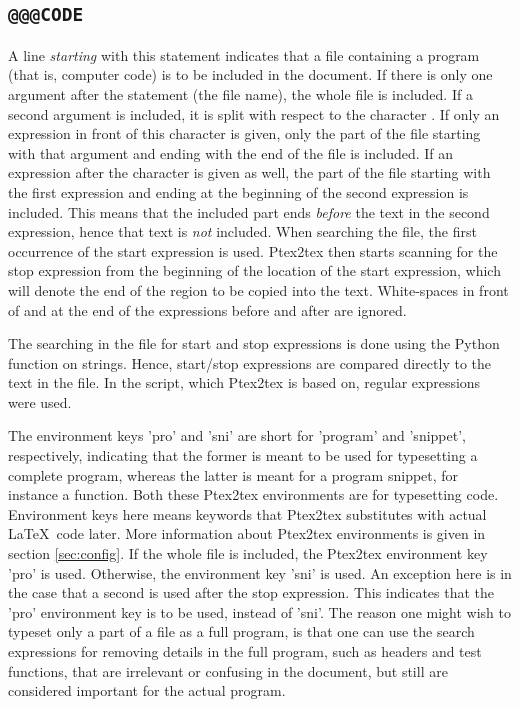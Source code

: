 \documentclass[a4paper,11pt]{article}
\begin{document}
\subsection{\texttt{@@@CODE}}
A line \emph{starting} with this statement indicates that a file containing a program
(that is, computer code) is to be included in the document. If there is only
one argument after the statement (the file name), the whole file is included. If a second
argument is included, it is split with respect to the character
. If only an expression in front of this character is given, 
only the part of the file starting with that
argument and ending with the end of the file is included. If an expression
after the character is given as well, the part of the file starting with the
first expression and ending at the beginning of the second expression is
included. This means that the included part ends \emph{before} the text in the second
expression, hence that text is \emph{not} included. When searching the file, the
first occurrence of the start expression is used. Ptex2tex then starts scanning
for the stop expression from the beginning of the location of the start expression,
which will denote the end of the
region to be copied into the text. White-spaces in front of and at the end of the
expressions before and after  are ignored.

The searching in the file for start and stop expressions is done using the
Python function  on strings. Hence, start/stop expressions are
compared directly to the text in the file. 
In the  script,
which Ptex2tex is based on, regular expressions were used.

The environment keys 'pro'
and 'sni' are short for 'program' and 'snippet', respectively, indicating that
the former is meant to be used for typesetting a complete program, whereas the
latter is meant for a program snippet, for instance a function. Both these
Ptex2tex environments are for typesetting code. Environment keys
here means keywords that Ptex2tex substitutes with actual \LaTeX~code
later. More information about Ptex2tex environments is given in section \ref{sec:config}.
If the whole file is included, the Ptex2tex environment key 'pro' is used. Otherwise,
the environment key 'sni' is used. An exception here is in the case that a
second  is used after the stop expression. This indicates that the 'pro'
environment key is to be used, instead of 'sni'. The reason one might wish to
typeset only a part of a file as a full program, is that one can use the
search expressions for removing details in the full program, such as headers
and test functions, that are irrelevant or confusing in the document, but
still are considered important for the actual program.
\end{document}
